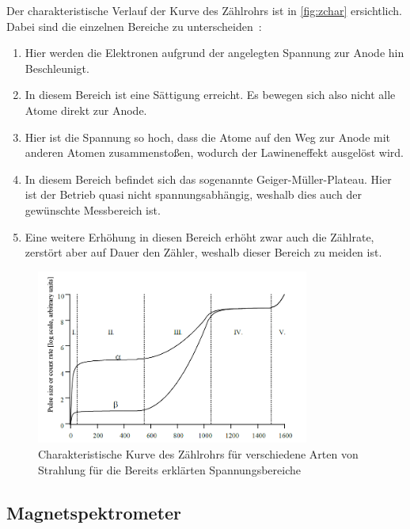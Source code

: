 \documentclass[12pt,english,ngerman]{scrartcl}
\begin{document}
Der charakteristische Verlauf der Kurve des Zählrohrs ist in
\autoref{fig:zchar} ersichtlich. Dabei sind die einzelnen Bereiche zu
unterscheiden~\cite[]{gerthsen}:

\begin{enumerate}[label = \Roman*.]
	\item Hier werden die Elektronen aufgrund der angelegten Spannung zur Anode hin
	      Beschleunigt.
	\item In diesem Bereich ist eine Sättigung erreicht. Es bewegen sich also nicht alle
	      Atome direkt zur Anode.
	\item Hier ist die Spannung so hoch, dass die Atome auf den Weg zur Anode mit anderen
	      Atomen zusammenstoßen, wodurch der Lawineneffekt ausgelöst wird.
	\item In diesem Bereich befindet sich das sogenannte Geiger-Müller-Plateau. Hier ist
	      der Betrieb quasi nicht spannungsabhängig, weshalb dies auch der gewünschte
	      Messbereich ist.
	\item Eine weitere Erhöhung in diesen Bereich erhöht zwar auch die Zählrate, zerstört
	      aber auf Dauer den Zähler, weshalb dieser Bereich zu meiden ist.
\end{enumerate}

\begin{figure}[H]
	\centering
	\includegraphics[width = 0.8\textwidth]{./figures/zcharakteristik.png}
	\caption{
		Charakteristische Kurve des Zählrohrs
		für verschiedene Arten von Strahlung für die
		Bereits erklärten Spannungsbereiche~\cite[]{zaehlrohrvorbereitung}
	}\label{fig:zchar}
\end{figure}

\subsection{Magnetspektrometer}
\end{document}
